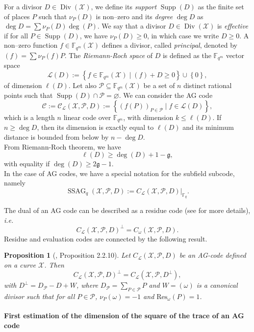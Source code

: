 \documentclass[a4paper]{article}
\newtheorem{proposition}[thm]{Proposition}
\theoremstyle{definition}
\theoremstyle{remark}
\newcommand{\calP}{\mathcal{P}}
\newcommand{\calL}{\mathcal{L}}
\newcommand{\calC}{\mathcal{C}}
\newcommand{\calX}{\mathcal{X}}
\newcommand{\fqm}{\mathbb{F}_{q^m}}
\newcommand{\fq}{\mathbb{F}_{q}}
\newcommand{\set}[1]{\left\{#1\right\}}
\newcommand{\Supp}{\operatorname{Supp}}
\newcommand{\Div}{\operatorname{Div}}
\newcommand{\ssag}[1]{\operatorname{SSAG}_{q}\left(#1\right)}
\begin{document}
For a divisor $D \in \Div(\calX)$, we define its \emph{support} $\Supp(D)$ as the finite set of places $P$ such that $\nu_P(D)$ is non--zero and its \emph{degree} $\deg D$ as $\deg D=\sum \nu_P(D) \deg(P)$. We say that a divisor $D \in \Div(\calX)$ is \emph{effective} if for all $P \in \Supp(D)$, we have $\nu_P(D) \geq 0$, in which case we write $D \geq 0$.
A non--zero function $f \in \fqm(\calX)$ defines a divisor, called \emph{principal}, denoted by $(f)=\sum \nu_P(f) P$. The \emph{Riemann-Roch space} of $D$ is defined as the $\fqm$ vector space
$$ \calL(D) := \set{f \in \fqm(\calX) \mid (f) + D \geq 0} \cup \set{0},$$
of dimension $\ell(D)$.
Let also $\calP \subseteq \fqm(\calX)$ be a set of $n$ distinct rational points such that $\Supp(D) \cap \calP = \varnothing$.
We can consider the AG code 
$$\calC := \calC_{\calL}(\calX,\calP,D) := \set{\left(f(P)\right)_{P \in \calP} \mid f \in \calL(D)},$$
which is a length $n$ linear code over $\fqm$, with dimension $k \leq \ell(D)$. If $n \geq \deg D$, then its dimension is exactly equal to $\ell(D)$ and its minimum distance is bounded from below by $n-\deg D$.\\
From Riemann-Roch theorem, we have
$$ \ell(D) \geq \deg(D) +1 - \mathfrak{g},$$ 
with equality if $\deg(D) \geq 2\mathfrak{g}-1$.\\
In the case of AG codes, we have a special notation for the subfield subcode, namely
\[\ssag{\calX,\calP,D} := C_{\calL}(\calX,\calP,D)|_{\fq}.\]

The dual of an AG code can be described as a residue code (see \cite{Sti09} for more details), \emph{i.e.}
$$ C_{\calL}(\calX,\calP,D)^{\perp} = C_{\omega}(\calX,\calP,D).$$ 
Residue and evaluation codes are connected by the following result.

\begin{proposition} [\cite{Sti09}, Proposition 2.2.10] \label{prop:dual_AG_codes}
Let $C_{\calL}(\calX,\calP,D)$ be an AG-code defined on a curve $\calX$. Then 
\[C_{\calL}(\calX,\calP,D)^{\perp} = C_{\calL}(\calX,\calP,D^{\perp}),\]
with $D^{\perp} = D_{\calP}-D+W$, where $D_{\calP} = \sum\limits_{P \in \calP} P$ and $W=(\omega)$ is a canonical divisor such that for all $P \in \calP$, $\nu_P(\omega)=-1$ and $\mathrm{Res}_{\omega}(P)=1$. 
\end{proposition}


\paragraph{First estimation of the dimension of the square of the trace of an AG code}
\end{document}
